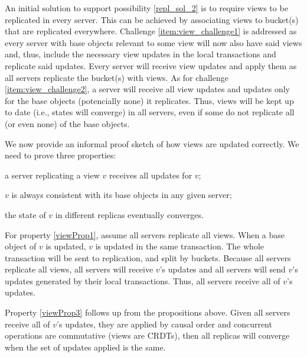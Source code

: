 \documentclass{vldb}
\begin{document}
An initial solution to support possibility \ref{repl_sol_2} is to require views to be replicated in every server.
This can be achieved by associating views to bucket(s) that are replicated everywhere.
Challenge \ref{item:view_challenge1} is addressed as every server with base objects relevant to some view will now also have said views and, thus, include the necessary view updates in the local transactions and replicate said updates.
Every server will receive view updates and apply them as all servers replicate the bucket(s) with views.
As for challenge \ref{item:view_challenge2}, a server will receive all view updates and updates only for the base objects (potencially none) it replicates. %
Thus, views will be kept up to date (i.e., states will converge) in all servers, even if some do not replicate all (or even none) of the base objects.

We now provide an informal proof sketch of how views are updated correctly.
We need to prove three properties:
\begin{enumerate*}[label=(\roman*)] 
	\item \label{viewProp1} a server replicating a view $v$ receives all updates for $v$;
	\item \label{viewProp2} $v$ is always consistent with its base objects in any given server;
	\item \label{viewProp3} the state of $v$ in different replicas eventually converges.
\end{enumerate*}

For property \ref{viewProp1}, assume all servers replicate all views.
When a base object of $v$ is updated, $v$ is updated in the same transaction.
The whole transaction will be sent to replication, and split by buckets.
Because all servers replicate all views, all servers will receive $v$'s updates and all servers will send $v$'s updates generated by their local transactions.
Thus, all servers receive all of $v$'s updates.

Property \ref{viewProp3} follows up from the propositions above.
Given all servers receive all of $v$'s updates, they are applied by causal order and concurrent operations are commutative (views are CRDTs), then all replicas will converge when the set of updates applied is the same.
\end{document}
